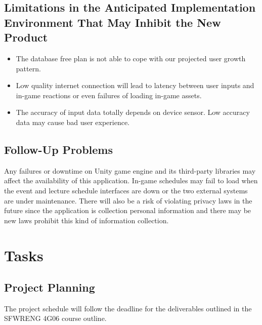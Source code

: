 \documentclass[12pt]{article}
\begin{document}
\subsection{Limitations in the Anticipated Implementation Environment That May
Inhibit the New Product}

\begin{itemize}
\item The database free plan is not able to cope with our projected user growth pattern.
\item Low quality internet connection will lead to latency between user inputs and in-game reactions or even failures of loading in-game assets.
\item The accuracy of input data totally depends on device sensor. Low accuracy data may cause bad user experience.
\end{itemize}

\subsection{Follow-Up Problems}

Any failures or downtime on Unity game engine and its third-party libraries may affect the availability of this application. In-game schedules may fail to load when the event and lecture schedule interfaces are down or the two external systems are under maintenance. There will also be a risk of violating privacy laws in the future since the application is collection personal information and there may be new laws prohibit this kind of information collection.

\section{Tasks}
\subsection{Project Planning}

The project schedule will follow the deadline for the deliverables outlined in the SFWRENG
4G06 course outline.
\end{document}
